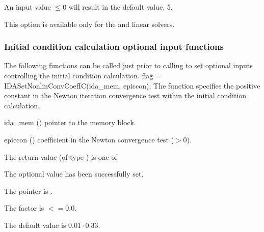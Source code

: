 {{  An input value  $\leq 0$ will result in the default value, 5.

  {\warn}This option is available only for the {\idaspbcg} and {\idasptfqmr} linear solvers.
}

\subsubsection{Initial condition calculation optional input functions}\label{sss:optin_iccalc}
The following functions can be called just prior to calling 
to set optional inputs controlling the initial condition calculation.
{
flag = IDASetNonlinConvCoefIC(ida\_mem, epiccon);
}
{
  The function  specifies the positive constant in
  the Newton iteration convergence test within the initial condition calculation.
}
{
  \begin{args}
  \item[ida\_mem] ()
    pointer to the {\idas} memory block.
  \item[epiccon] ()
    coefficient in the Newton convergence test ($>0$).
  \end{args}
}
{
  The return value  (of type ) is one of
  \begin{args}
  \item[\Id{IDA\_SUCCESS}] 
    The optional value has been successfully set.
  \item[\Id{IDA\_MEM\_NULL}]
    The  pointer is .
  \item[\Id{IDA\_ILL\_INPUT}]
    The  factor is $<= 0.0$.
  \end{args}
}
{
  The default value is $0.01 \cdot 0.33$.

}}
